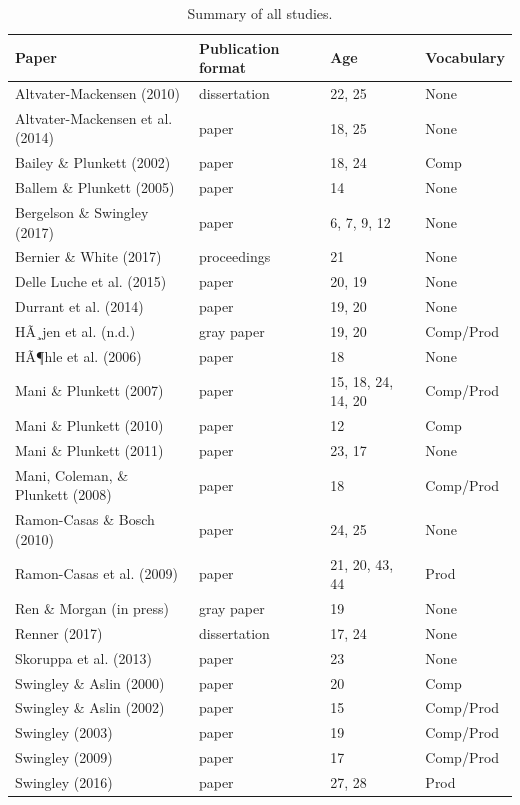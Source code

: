 \documentclass[man]{apa6}
\theoremstyle{definition}
\theoremstyle{definition}
\theoremstyle{definition}
\theoremstyle{remark}
\begin{document}
\begin{table}[tbp]
\begin{center}
\begin{threeparttable}
\caption{\label{tab:SummaryTable}Summary of all studies.}
\begin{tabular}{llll}
\toprule
Paper & Publication format & Age & Vocabulary\\
\midrule
Altvater-Mackensen (2010) & dissertation & 22, 25 & None\\
Altvater-Mackensen et al. (2014) & paper & 18, 25 & None\\
Bailey \& Plunkett (2002) & paper & 18, 24 & Comp\\
Ballem \& Plunkett (2005) & paper & 14 & None\\
Bergelson \& Swingley (2017) & paper & 6, 7, 9, 12 & None\\
Bernier \& White (2017) & proceedings & 21 & None\\
Delle Luche et al. (2015) & paper & 20, 19 & None\\
Durrant et al. (2014) & paper & 19, 20 & None\\
HÃ¸jen et al. (n.d.) & gray paper & 19, 20 & Comp/Prod\\
HÃ¶hle et al. (2006) & paper & 18 & None\\
Mani \& Plunkett (2007) & paper & 15, 18, 24, 14, 20 & Comp/Prod\\
Mani \& Plunkett (2010) & paper & 12 & Comp\\
Mani \& Plunkett (2011) & paper & 23, 17 & None\\
Mani, Coleman, \& Plunkett (2008) & paper & 18 & Comp/Prod\\
Ramon-Casas \& Bosch (2010) & paper & 24, 25 & None\\
Ramon-Casas et al. (2009) & paper & 21, 20, 43, 44 & Prod\\
Ren \& Morgan (in press) & gray paper & 19 & None\\
Renner (2017) & dissertation & 17, 24 & None\\
Skoruppa et al. (2013) & paper & 23 & None\\
Swingley \& Aslin (2000) & paper & 20 & Comp\\
Swingley \& Aslin (2002) & paper & 15 & Comp/Prod\\
Swingley (2003) & paper & 19 & Comp/Prod\\
Swingley (2009) & paper & 17 & Comp/Prod\\
Swingley (2016) & paper & 27, 28 & Prod\\

\end{tabular}
\end{threeparttable}
\end{center}
\end{table}
\end{document}
